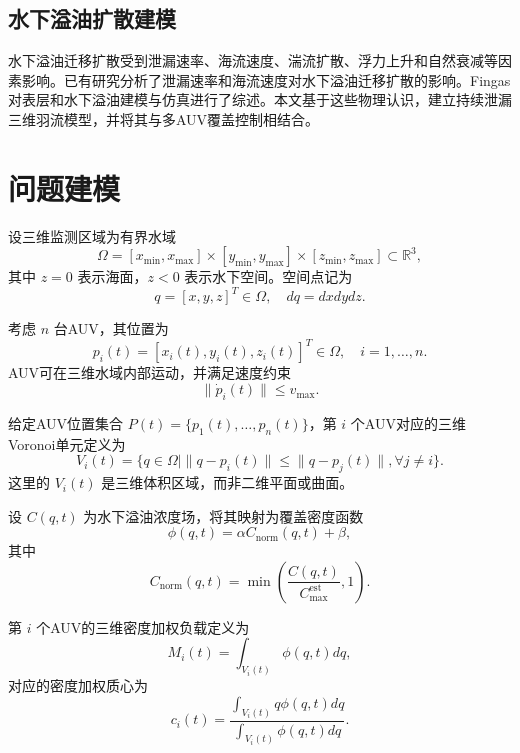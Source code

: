 \documentclass[conference]{IEEEtran}
\begin{document}
\subsection{水下溢油扩散建模}
水下溢油迁移扩散受到泄漏速率、海流速度、湍流扩散、浮力上升和自然衰减等因素影响。已有研究分析了泄漏速率和海流速度对水下溢油迁移扩散的影响\cite{zhang2020oil}。Fingas对表层和水下溢油建模与仿真进行了综述\cite{fingas2022overview}。本文基于这些物理认识，建立持续泄漏三维羽流模型，并将其与多AUV覆盖控制相结合。

\section{问题建模}
设三维监测区域为有界水域
\begin{equation}
\Omega=[x_{\min},x_{\max}]\times[y_{\min},y_{\max}]\times[z_{\min},z_{\max}]\subset\mathbb{R}^3,
\end{equation}
其中 $z=0$ 表示海面，$z<0$ 表示水下空间。空间点记为
\begin{equation}
q=[x,y,z]^T\in\Omega,\quad dq=dxdydz.
\end{equation}

考虑 $n$ 台AUV，其位置为
\begin{equation}
p_i(t)=[x_i(t),y_i(t),z_i(t)]^T\in\Omega,\quad i=1,\ldots,n.
\end{equation}
AUV可在三维水域内部运动，并满足速度约束
\begin{equation}
\|\dot p_i(t)\|\leq v_{\max}.
\end{equation}

给定AUV位置集合 $P(t)=\{p_1(t),\ldots,p_n(t)\}$，第 $i$ 个AUV对应的三维Voronoi单元定义为
\begin{equation}
V_i(t)=\{q\in\Omega\mid \|q-p_i(t)\|\leq \|q-p_j(t)\|,\forall j\neq i\}.
\end{equation}
这里的 $V_i(t)$ 是三维体积区域，而非二维平面或曲面。

设 $C(q,t)$ 为水下溢油浓度场，将其映射为覆盖密度函数
\begin{equation}
\phi(q,t)=\alpha C_{\mathrm{norm}}(q,t)+\beta,
\end{equation}
其中
\begin{equation}
C_{\mathrm{norm}}(q,t)=\min\left(\frac{C(q,t)}{C_{\max}^{\mathrm{est}}},1\right).
\end{equation}

第 $i$ 个AUV的三维密度加权负载定义为
\begin{equation}
M_i(t)=\int_{V_i(t)}\phi(q,t)dq,
\end{equation}
对应的密度加权质心为
\begin{equation}
c_i(t)=
\frac{\int_{V_i(t)}q\phi(q,t)dq}
{\int_{V_i(t)}\phi(q,t)dq}.
\end{equation}
\end{document}
